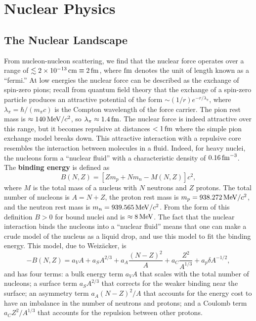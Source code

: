\chapter{Nuclear Physics}

\section{The Nuclear Landscape}

From nucleon-nucleon scattering, we find that the nuclear force operates over a range of $\lesssim 2\times 10^{-13}\,\mathrm{c}\mathrm{m} \equiv 2\,\mathrm{fm}$, where $\mathrm{fm}$ denotes the unit of length known as a ``fermi.''  At low energies the nuclear force can be described as the exchange of spin-zero pions; recall from quantum field theory that  the exchange of a spin-zero particle produces an attractive potential of the form $\sim (1/r)e^{-r/\lambda_{\pi}}$, where $\lambda_{\pi} = \hbar/(m_{\pi}c)$ is the Compton wavelength of the force carrier. The pion rest mass is $\approx 140\,\mathrm{M}\mathrm{eV}/c^{2}$, so $\lambda_{\pi} \approx 1.4\,\mathrm{fm}$.  The nuclear force is indeed attractive over this range,  but it becomes repulsive at distances $< 1\,\mathrm{fm}$ where the simple pion exchange model breaks down.  This attractive interaction with a repulsive core resembles the interaction between molecules in a fluid.  Indeed, for heavy nuclei, the nucleons form a ``nuclear fluid'' with a characteristic density of $0.16\,\mathrm{fm}^{-3}$.  The \textbf{binding energy} is defined as
\begin{equation}\label{e.binding-energy-def}
B(N,Z) = \left[Z m_{p} + N m_{n} - M(N,Z)\right] c^{2},
\end{equation}
where $M$ is the total mass of a nucleus with $N$ neutrons and $Z$ protons. The total number of nucleons is $A = N+Z$, the proton rest mass is $m_{p} = 938.272\,\mathrm{M}\mathrm{eV}/c^{2}$, and the neutron rest mass is $m_{n} = 939.565\,\mathrm{M}\mathrm{eV}/c^{2}$.
From the form of this definition $B > 0$ for bound nuclei and is $\approx 8\,\mathrm{M}\mathrm{eV}$. The fact that the nuclear interaction binds the nucleons into a ``nuclear fluid'' means that one can make a crude model of the nucleus as a liquid drop, and use this model to fit the binding energy.
This model, due to Weiz\"acker, is
\begin{equation}\label{e.weizacker-fmla}
-B(N, Z) = a_{V} A + a_{S}A^{2/3} + a_{A}\frac{(N-Z)^{2}}{A} + a_{C}\frac{Z^{2}}{A^{1/3}} + a_{p}\delta A^{-1/2},
\end{equation}
and has four terms: a bulk energy term $a_{V}A$ that scales with the total number of nucleons; a surface term $a_{S}A^{2/3}$ that corrects for the weaker binding near the surface; an asymmetry term $a_{A}(N-Z)^{2}/A$ that accounts for the energy cost to have an imbalance in the number of neutrons and protons; and a Coulomb term $a_{C}Z^{2}/A^{1/3}$ that accounts for the repulsion between other protons.  
